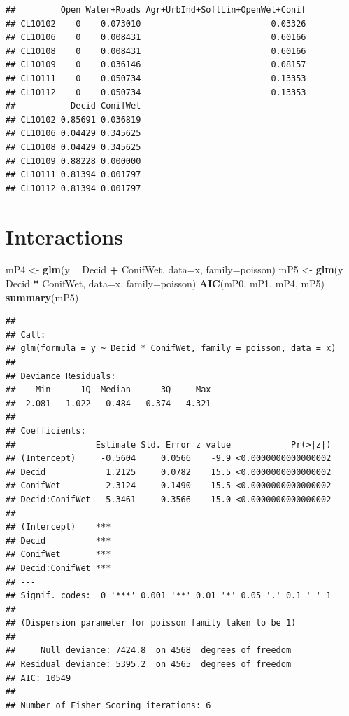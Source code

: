 \documentclass[12pt,]{book}
\newenvironment{Shaded}{\begin{snugshade}}{\end{snugshade}}
\newcommand{\DataTypeTok}[1]{\textcolor[rgb]{0.13,0.29,0.53}{#1}}
\newcommand{\KeywordTok}[1]{\textcolor[rgb]{0.13,0.29,0.53}{\textbf{#1}}}
\newcommand{\NormalTok}[1]{#1}
\newcommand{\OperatorTok}[1]{\textcolor[rgb]{0.81,0.36,0.00}{\textbf{#1}}}
\newcommand{\StringTok}[1]{\textcolor[rgb]{0.31,0.60,0.02}{#1}}
\begin{document}
\begin{verbatim}
##         Open Water+Roads Agr+UrbInd+SoftLin+OpenWet+Conif
## CL10102    0    0.073010                          0.03326
## CL10106    0    0.008431                          0.60166
## CL10108    0    0.008431                          0.60166
## CL10109    0    0.036146                          0.08157
## CL10111    0    0.050734                          0.13353
## CL10112    0    0.050734                          0.13353
##           Decid ConifWet
## CL10102 0.85691 0.036819
## CL10106 0.04429 0.345625
## CL10108 0.04429 0.345625
## CL10109 0.88228 0.000000
## CL10111 0.81394 0.001797
## CL10112 0.81394 0.001797
\end{verbatim}

\hypertarget{interactions}{%
\section{Interactions}\label{interactions}}

\begin{Shaded}
\begin{Highlighting}[]
\NormalTok{mP4 <-}\StringTok{ }\KeywordTok{glm}\NormalTok{(y }\OperatorTok{~}\StringTok{ }\NormalTok{Decid }\OperatorTok{+}\StringTok{ }\NormalTok{ConifWet, }\DataTypeTok{data=}\NormalTok{x, }\DataTypeTok{family=}\NormalTok{poisson)}
\NormalTok{mP5 <-}\StringTok{ }\KeywordTok{glm}\NormalTok{(y }\OperatorTok{~}\StringTok{ }\NormalTok{Decid }\OperatorTok{*}\StringTok{ }\NormalTok{ConifWet, }\DataTypeTok{data=}\NormalTok{x, }\DataTypeTok{family=}\NormalTok{poisson)}
\KeywordTok{AIC}\NormalTok{(mP0, mP1, mP4, mP5)}
\KeywordTok{summary}\NormalTok{(mP5)}
\end{Highlighting}
\end{Shaded}

\begin{verbatim}
## 
## Call:
## glm(formula = y ~ Decid * ConifWet, family = poisson, data = x)
## 
## Deviance Residuals: 
##    Min      1Q  Median      3Q     Max  
## -2.081  -1.022  -0.484   0.374   4.321  
## 
## Coefficients:
##                Estimate Std. Error z value            Pr(>|z|)
## (Intercept)     -0.5604     0.0566    -9.9 <0.0000000000000002
## Decid            1.2125     0.0782    15.5 <0.0000000000000002
## ConifWet        -2.3124     0.1490   -15.5 <0.0000000000000002
## Decid:ConifWet   5.3461     0.3566    15.0 <0.0000000000000002
##                   
## (Intercept)    ***
## Decid          ***
## ConifWet       ***
## Decid:ConifWet ***
## ---
## Signif. codes:  0 '***' 0.001 '**' 0.01 '*' 0.05 '.' 0.1 ' ' 1
## 
## (Dispersion parameter for poisson family taken to be 1)
## 
##     Null deviance: 7424.8  on 4568  degrees of freedom
## Residual deviance: 5395.2  on 4565  degrees of freedom
## AIC: 10549
## 
## Number of Fisher Scoring iterations: 6
\end{verbatim}
\end{document}
